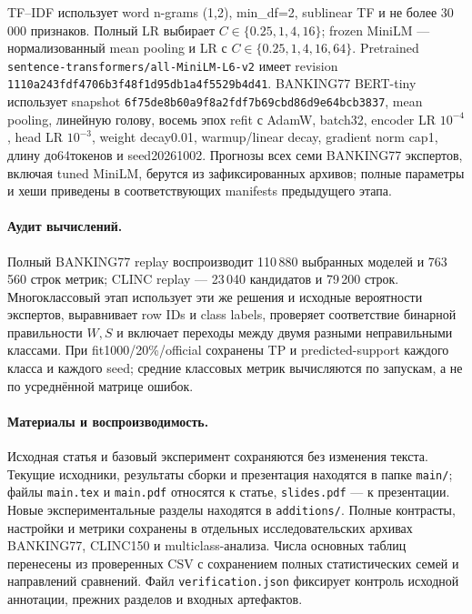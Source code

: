 TF--IDF использует word n-grams (1,2), min\_df=2,
sublinear TF и не более 30\,000 признаков. Полный LR выбирает
$C\in\{0.25,1,4,16\}$; frozen MiniLM --- нормализованный mean pooling
и LR с $C\in\{0.25,1,4,16,64\}$.
Pretrained \texttt{sentence-transformers/all-MiniLM-L6-v2}
имеет revision \texttt{1110a243fdf4706b3f48f1d95db1a4f5529b4d41}.
BANKING77 BERT-tiny использует snapshot
\texttt{6f75de8b60a9f8a2fdf7b69cbd86d9e64bcb3837},
mean pooling, линейную голову, восемь эпох refit с AdamW,
batch32, encoder LR $10^{-4}$, head LR $10^{-3}$,
weight decay0.01, warmup/linear decay, gradient norm cap1,
длину до64токенов и seed20261002.
Прогнозы всех семи BANKING77 экспертов, включая tuned MiniLM,
берутся из зафиксированных архивов; полные параметры и хеши
приведены в соответствующих manifests предыдущего этапа.

\paragraph{Аудит вычислений.}
Полный BANKING77 replay воспроизводит 110\,880 выбранных моделей
и 763\,560 строк метрик; CLINC replay --- 23\,040 кандидатов
и 79\,200 строк. Многоклассовый этап использует эти же решения
и исходные вероятности экспертов, выравнивает row IDs и class labels,
проверяет соответствие бинарной правильности $W,S$ и включает
переходы между двумя разными неправильными классами.
При fit1000/20\%/official сохранены TP и predicted-support
каждого класса и каждого seed; средние классовых метрик вычисляются
по запускам, а не по усреднённой матрице ошибок.



\paragraph{Материалы и воспроизводимость.}
Исходная статья и базовый эксперимент сохраняются без изменения текста.
Текущие исходники, результаты сборки и презентация находятся в папке
\texttt{main/}; файлы \texttt{main.tex} и \texttt{main.pdf} относятся к статье,
\texttt{slides.pdf} --- к презентации.
Новые экспериментальные разделы находятся в \texttt{additions/}.
Полные контрасты, настройки и метрики сохранены в отдельных
исследовательских архивах BANKING77, CLINC150 и multiclass-анализа.
Числа основных таблиц перенесены из проверенных CSV с сохранением
полных статистических семей и направлений сравнений.
Файл \texttt{verification.json} фиксирует контроль исходной аннотации,
прежних разделов и входных артефактов.
